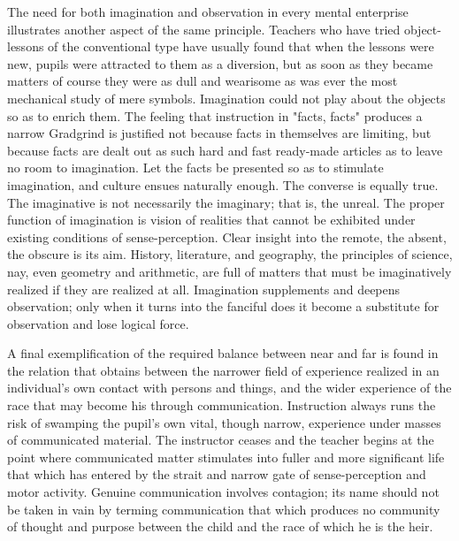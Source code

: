\documentclass[letterpaper]{book}
\begin{document}
The need for both imagination and observation in every mental enterprise
illustrates another aspect of the same principle. Teachers who have
tried object-lessons of the conventional type have usually found that
when the lessons were new, pupils were attracted to them as a diversion,
but as soon as they became matters of course they were as dull and
wearisome as was ever the most mechanical study of mere symbols.
Imagination could not play about the objects so as to enrich them. The
feeling that instruction in "facts, facts" produces a narrow Gradgrind
is justified not because facts in themselves are limiting, but because
facts are dealt
out
as such hard and fast ready-made articles as to leave no room to
imagination. Let the facts be presented so as to stimulate imagination,
and culture ensues naturally enough. The converse is equally true. The
imaginative is not necessarily the imaginary; that is, the unreal. The
proper function of imagination is vision of realities that cannot be
exhibited under existing conditions of sense-perception. Clear insight
into the remote, the absent, the obscure is its aim. History,
literature, and geography, the principles of science, nay, even geometry
and arithmetic, are full of matters that must be imaginatively realized
if they are realized at all. Imagination supplements and deepens
observation; only when it turns into the fanciful does it become a
substitute for observation and lose logical force.


A final exemplification of the required balance between near and far is
found in the relation that obtains between the narrower field of
experience realized in an individual's own contact with persons and
things, and the wider experience of the race that may become his through
communication. Instruction always runs the risk of swamping the pupil's
own vital, though narrow, experience under masses of communicated
material. The instructor ceases and the teacher begins at the point
where communicated matter stimulates into fuller and more significant
life that which has entered by the strait and narrow gate of
sense-perception and motor activity. Genuine communication involves
contagion; its name should not be taken in vain by terming communication
that which produces no community of thought and purpose between the
child and the race of which he is the
heir.
\end{document}
